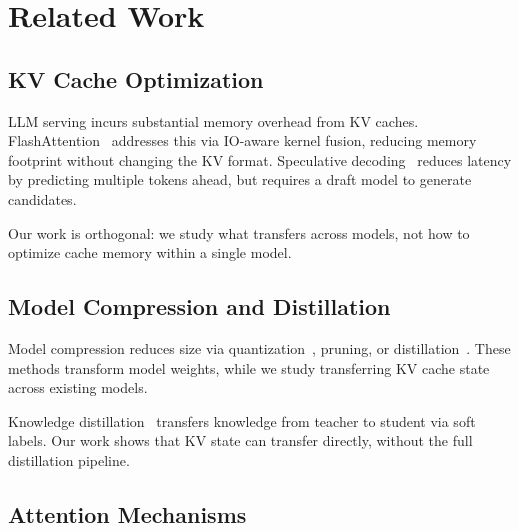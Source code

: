 
\section{Related Work}
\label{sec:related}

\subsection{KV Cache Optimization}

LLM serving incurs substantial memory overhead from KV caches.
FlashAttention~\cite{dao2022flashattention} addresses this via IO-aware kernel fusion,
reducing memory footprint without changing the KV format.
Speculative decoding~\cite{leviathan2023fast,chen2023accelerating}
reduces latency by predicting multiple tokens ahead,
but requires a draft model to generate candidates.

Our work is orthogonal: we study what transfers across models,
not how to optimize cache memory within a single model.

\subsection{Model Compression and Distillation}

Model compression reduces size via quantization~\cite{frantar2023gptq,dettmers2024qlora},
pruning, or distillation~\cite{touvron2023llama}.
These methods transform model weights,
while we study transferring KV cache state across existing models.

Knowledge distillation~\cite{hinton2015distilling}
transfers knowledge from teacher to student via soft labels.
Our work shows that KV state can transfer directly,
without the full distillation pipeline.

\subsection{Attention Mechanisms}

